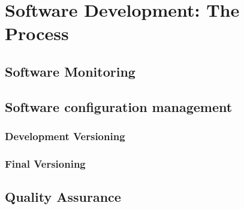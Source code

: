 \chapter{Software Development: The Process}
\section{Software Monitoring}

\section{Software configuration management}
\subsection{Development Versioning}
\subsection{Final Versioning}

\section{Quality Assurance}
